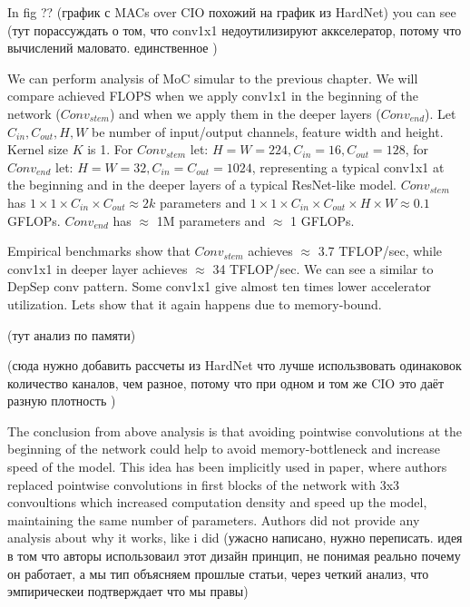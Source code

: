 In fig ?? (график с MACs over CIO похожий на график из HardNet) you can see 
(тут порассуждать о том, что conv1x1 недоутилизируют аккселератор, потому что вычислений маловато. единственное )

We can perform analysis of MoC simular to the previous chapter. We will compare achieved FLOPS when we apply conv1x1 in the beginning of the network ($Conv_{stem}$) and when we apply them in the deeper layers ($Conv_{end}$). Let $C_{in}, C_{out}, H, W$ be number of input/output channels, feature width and height. Kernel size $K$ is 1. For $Conv_{stem}$ let:  $H=W=224, C_{in} = 16, C_{out}=128$, for $Conv_{end}$ let: $H=W=32, C_{in} = C_{out}=1024$, representing a typical conv1x1 at the beginning and in the deeper layers of a typical ResNet-like model.
$Conv_{stem}$ has $ 1 \times 1 \times C_{in} \times C_{out} \approx 2k$ parameters and $ 1 \times 1 \times C_{in} \times C_{out} \times H \times W \approx 0.1 $ GFLOPs. $Conv_{end}$ has $\approx$ 1M parameters and $\approx$ 1 GFLOPs. 

%

Empirical benchmarks show that $Conv_{stem}$ achieves $\approx$ 3.7 TFLOP/sec, while conv1x1 in deeper layer achieves $\approx$ 34 TFLOP/sec. We can see a similar to DepSep conv pattern. Some conv1x1 give almost ten times lower accelerator utilization. Lets show that it again happens due to memory-bound.

(тут анализ по памяти)

(сюда нужно добавить рассчеты из HardNet что лучше использвовать одинаковок количество каналов, чем разное, потому что при одном и том же CIO это даёт разную плотность )

The conclusion from above analysis is that avoiding pointwise convolutions at the beginning of the network could help to avoid memory-bottleneck and increase speed of the model. This idea has been implicitly used in \cite{ridnik2021_tresnet} paper, where authors replaced pointwise convolutions in first blocks of the network with 3x3 convoultions which increased computation density and speed up the model, maintaining the same number of parameters. Authors did not provide any analysis about why it works, like i did (ужасно написано, нужно переписать. идея в том что авторы использоваил этот дизайн принцип, не понимая реально почему он работает, а мы тип объясняем прошлые статьи, через четкий анализ, что эмпирическеи подтверждает что мы правы)


